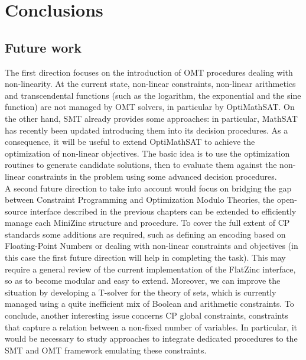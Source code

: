 \chapter{Conclusions}
\label{cha:conclusioni}

\section{Future work}

The first direction focuses on the introduction of OMT procedures dealing with non-linearity. At the current state, non-linear constraints, non-linear arithmetics and transcendental functions (such as the logarithm, the exponential and the sine function) are not managed by OMT solvers, in particular by OptiMathSAT. On the other hand, SMT already provides some approaches: in particular, MathSAT has recently been updated introducing them into its decision procedures. As a consequence, it will be useful to extend OptiMathSAT to achieve the optimization of non-linear objectives. The basic idea is to use the optimization routines to
generate candidate solutions, then to evaluate them against the non-linear constraints in the problem using some advanced decision procedures. \\
A second future direction to take into account would focus on bridging the gap between Constraint Programming and Optimization Modulo Theories, the open-source interface described in the previous chapters can be extended to efficiently manage each MiniZinc structure and procedure. To cover the full extent of CP standards some additions are required, such as defining an encoding based on Floating-Point Numbers or dealing with non-linear constraints and objectives (in this case the first future direction will help in completing the task). This may require a general review of the current implementation of the FlatZinc interface, so as to become modular and easy to extend.
Moreover, we can improve the situation by developing a T-solver for the theory of sets, which is currently managed using a quite inefficient mix of Boolean and arithmetic constraints. 
To conclude, another interesting issue concerns CP global constraints, constraints that capture a relation between a non-fixed number of variables. In particular, it would be necessary to study approaches to integrate dedicated procedures to the SMT and OMT framework emulating these constraints. \\
 



